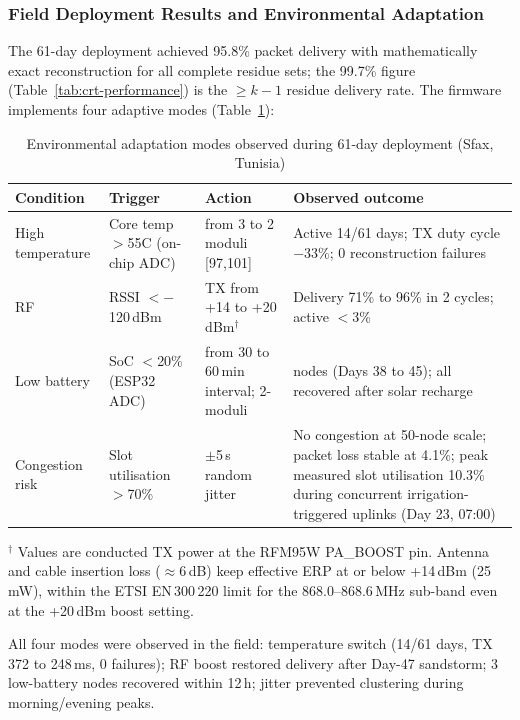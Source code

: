 \documentclass[pdflatex,sn-mathphys-num]{sn-jnl}
\theoremstyle{thmstyleone}
\theoremstyle{thmstyletwo}
\theoremstyle{thmstylethree}
\begin{document}
\subsubsection{Field Deployment Results and Environmental Adaptation}
The 61-day deployment achieved 95.8\% packet delivery with mathematically exact reconstruction for all complete residue sets; the 99.7\% figure (Table~\ref{tab:crt-performance}) is the $\geq k-1$ residue delivery rate. The firmware implements four adaptive modes (Table~\ref{tab:env-adaptation}):

\begin{table}[htbp]
\centering
\caption{Environmental adaptation modes observed during 61-day deployment (Sfax, Tunisia)}
\label{tab:env-adaptation}
\scriptsize
\setlength{\tabcolsep}{1pt}
\begin{tabularx}{\columnwidth}{>{\raggedright\arraybackslash}p{1.85cm}>{\raggedright\arraybackslash}X>{\raggedright\arraybackslash}X>{\raggedright\arraybackslash}X}
\toprule
\textbf{Condition} & \textbf{Trigger} & \textbf{Action} & \textbf{Observed outcome} \\
\midrule
High temperature & Core temp $>$55\textdegree{}C (on-chip ADC) & from 3 to 2 moduli [97,101] & Active 14/61 days; TX duty cycle $-$33\%; 0 reconstruction failures \\
RF & RSSI $<$$-$120\,dBm & TX from +14 to +20\,dBm$^\dagger$ & Delivery 71\% to 96\% in 2 cycles; active $<$3\% \\
Low battery & SoC $<$20\% (ESP32 ADC) & from 30 to 60\,min interval; 2-moduli & 3 nodes (Days 38 to 45); all recovered after solar recharge \\
Congestion risk & Slot utilisation $>$70\% & $\pm$5\,s random jitter & No congestion at 50-node scale; packet loss stable at 4.1\%; peak measured slot utilisation 10.3\% during concurrent irrigation-triggered uplinks (Day 23, 07:00) \\
\bottomrule
\end{tabularx}
{\footnotesize $^\dagger$ Values are conducted TX power at the RFM95W PA\_BOOST pin. Antenna and cable insertion loss ($\approx$6\,dB) keep effective ERP at or below +14\,dBm (25\,mW), within the ETSI EN\,300\,220 limit for the 868.0--868.6\,MHz sub-band even at the +20\,dBm boost setting.}
\end{table}

All four modes were observed in the field: temperature switch (14/61 days, TX 372 to 248\,ms, 0 failures); RF boost restored delivery after Day-47 sandstorm; 3 low-battery nodes recovered within 12\,h; jitter prevented clustering during morning/evening peaks.
\end{document}
